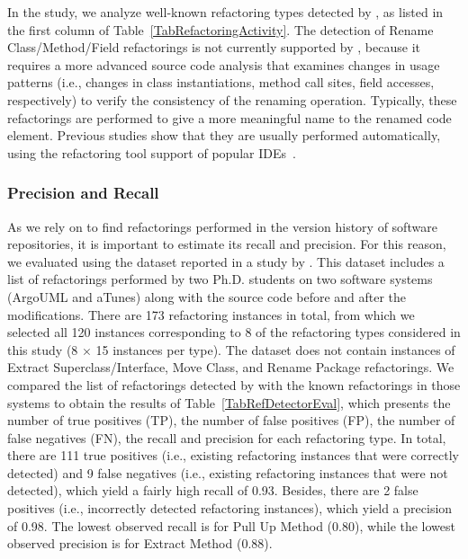 In the study, we analyze  well-known refactoring types detected by \toolName, as listed in the first column of Table~\ref{TabRefactoringActivity}.
The detection of {\textsc Rename Class/Method/Field} refactorings is not currently supported by \toolName, because it requires a more advanced source code analysis that examines changes in usage patterns (i.e., changes in class instantiations, method call sites, field accesses, respectively) to verify the consistency of the renaming operation.
Typically, these refactorings are performed to give a more meaningful name to the renamed code element. Previous studies show that they are usually performed automatically, using the refactoring tool support of popular IDEs~\citep{MurphyHill2012, negara2013}.



\subsubsection{\toolName Precision and Recall}
\label{sec:precision_recall}
As we rely on \toolName to find refactorings performed in the version history of software repositories,
it is important to estimate its recall and precision. For this reason, we evaluated \toolName using the dataset reported in a study by \cite{Chaparro:2014}.
This dataset includes a list of refactorings performed by two Ph.D. students on two software systems (ArgoUML 
and aTunes) along with the source code before and after the modifications. 
There are 173 refactoring instances in total, from which we selected all 120 instances corresponding to 8 of the refactoring types considered in this study (8 $\times$ 15 instances per type).
The dataset does not contain instances of {\textsc Extract Superclass/Interface}, {\textsc Move Class}, and {\textsc Rename Package} refactorings.
We compared the list of refactorings detected by \toolName with the known refactorings in those systems to 
obtain the results of Table~\ref{TabRefDetectorEval}, which presents the number of true positives (TP), 
the number of false positives (FP), the number of false negatives (FN), the recall and precision for each 
refactoring type.
In total, there are 111 true positives (i.e., existing refactoring instances that were correctly detected) and 9 false negatives (i.e., existing refactoring instances that were not detected), which yield a fairly high recall of 0.93.
Besides, there are 2 false positives (i.e., incorrectly detected refactoring instances), which yield a precision of 0.98.
The lowest observed recall is for {\textsc Pull Up Method} (0.80), while the lowest observed precision is for {\textsc Extract Method} (0.88).

